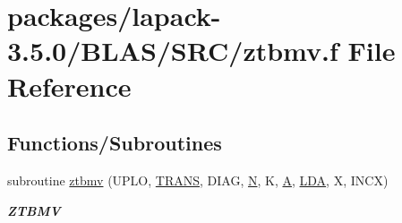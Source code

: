 \hypertarget{lapack-3_85_80_2BLAS_2SRC_2ztbmv_8f}{}\section{packages/lapack-\/3.5.0/\+B\+L\+A\+S/\+S\+R\+C/ztbmv.f File Reference}
\label{lapack-3_85_80_2BLAS_2SRC_2ztbmv_8f}
\subsection*{Functions/\+Subroutines}
\begin{DoxyCompactItemize}
\item 
subroutine \hyperlink{group__complex16__blas__level2_ga2eb62f52e98a997e5f88f86d53cd0d4f}{ztbmv} (U\+P\+L\+O, \hyperlink{superlu__enum__consts_8h_a0c4e17b2d5cea33f9991ccc6a6678d62a1f61e3015bfe0f0c2c3fda4c5a0cdf58}{T\+R\+A\+N\+S}, D\+I\+A\+G, \hyperlink{polmisc_8c_a0240ac851181b84ac374872dc5434ee4}{N}, K, \hyperlink{classA}{A}, \hyperlink{example__user_8c_ae946da542ce0db94dced19b2ecefd1aa}{L\+D\+A}, X, I\+N\+C\+X)
\begin{DoxyCompactList}\small\item\em {\bfseries Z\+T\+B\+M\+V} \end{DoxyCompactList}\end{DoxyCompactItemize}

